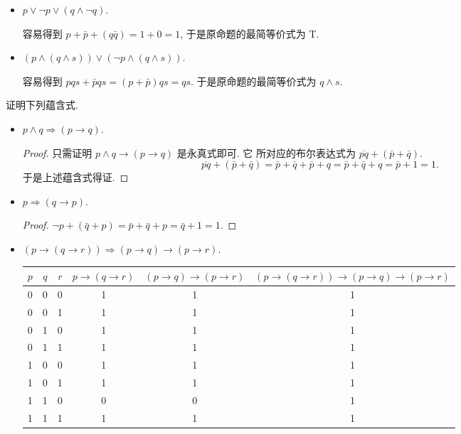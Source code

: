 \documentclass[10pt,UTF8]{book} %
\begin{document}
\begin{exercise}
\begin{itemize}[itemsep=0pt]
        \item $p \vee \lnot p \vee (q \wedge \lnot q)$.
        \begin{sol}
            容易得到 $p + \bar p + (q \bar q) = 1 + 0 = 1$,
            于是原命题的最简等价式为 T.
        \end{sol}

        \item $(p \wedge (q \wedge s)) \vee (\lnot p \wedge (q \wedge s))$.
        \begin{sol}
            容易得到 $pqs + \bar p qs = (p + \bar p)qs = qs$.
            于是原命题的最简等价式为 $q \wedge s$.
        \end{sol}
    \end{itemize}
\end{exercise}

\begin{exercise}
    证明下列蕴含式.
    \begin{itemize}[itemsep=0pt]
        \item $p \wedge q \Longrightarrow (p \to q)$.
        \begin{proof}
            只需证明 $p \wedge q \to (p \to q)$
            是永真式即可. 它
            所对应的布尔表达式为 $\overline{pq} + (\bar p + \bar q)$.
            \[ \overline{pq} + (\bar p + \bar q)
            = \bar p + \bar q + \bar p + q
            = \bar p + \bar q + q = \bar p + 1 = 1. \]
            于是上述蕴含式得证.
        \end{proof}
        \item $p \Longrightarrow (q \to p)$.
        \begin{proof}
            $\lnot p + \left( \bar q + p \right) = \bar p + \bar q + p
            = \bar q + 1 = 1$.
        \end{proof}
        \item $(p \to (q \to r)) \Longrightarrow (p \to q) \to (p \to r)$.
        \begin{table}[H]
            \centering
            \begin{tabular}{cccccc}
                \hline
                $p$ & $q$ & $r$ & $p \to (q \to r)$ & $(p \to q) \to (p \to r)$ & $(p \to (q \to r)) \rightarrow (p \to q) \to (p \to r)$ \\
                \hline 
                0 & 0 & 0 & 1 & 1 & 1 \\
                0 & 0 & 1 & 1 & 1 & 1 \\
                0 & 1 & 0 & 1 & 1 & 1 \\
                0 & 1 & 1 & 1 & 1 & 1 \\
                1 & 0 & 0 & 1 & 1 & 1 \\
                1 & 0 & 1 & 1 & 1 & 1 \\
                1 & 1 & 0 & 0 & 0 & 1 \\
                1 & 1 & 1 & 1 & 1 & 1 \\
                \hline
            \end{tabular}
        \end{table}
    \end{itemize}
\end{exercise}
\end{document}
